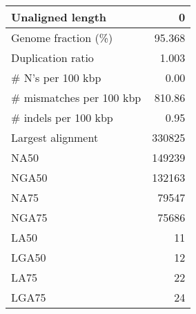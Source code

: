 \documentclass[12pt,a4paper]{article}
\begin{document}
\begin{table}[ht]
\begin{center}
\begin{tabular}{|l*{1}{|r}|}
Unaligned length & 0 \\ \hline
Genome fraction (\%) & 95.368 \\ \hline
Duplication ratio & 1.003 \\ \hline
\# N's per 100 kbp & 0.00 \\ \hline
\# mismatches per 100 kbp & 810.86 \\ \hline
\# indels per 100 kbp & 0.95 \\ \hline
Largest alignment & 330825 \\ \hline
NA50 & 149239 \\ \hline
NGA50 & 132163 \\ \hline
NA75 & 79547 \\ \hline
NGA75 & 75686 \\ \hline
LA50 & 11 \\ \hline
LGA50 & 12 \\ \hline
LA75 & 22 \\ \hline
LGA75 & 24 \\ \hline
\end{tabular}
\end{center}
\end{table}
\end{document}
